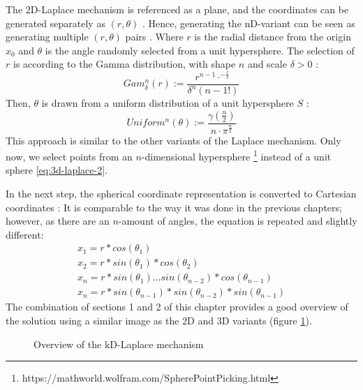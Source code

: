 The 2D-Laplace mechanism is referenced as a plane, and the coordinates can be generated separately as $(r, \theta)$ \citep{fernandes_generalised_2019,DBLP:journals/corr/abs-1212-1984}.
Hence, generating the nD-variant can be seen as generating multiple $(r, \theta)$ pairs \citep{fernandes_generalised_2019}.
Where $r$ is the radial distance from the origin $x_0$ and $\theta$ is the angle randomly selected from a unit hypersphere.
The selection of $r$ is according to the Gamma distribution, with shape $n$ and scale $\delta > 0$ \cite{fernandes_generalised_2019}:
\begin{equation}
  Gam^n_\delta(r) := \frac{r^{n-1}\cdot^{-\frac{r}{\delta}}}{\delta^n(n-1!)}
\end{equation}
Then, $\theta$ is drawn from a uniform distribution of a unit hypersphere $S$ \citep{fernandes_generalised_2019}:
\begin{equation}
  Uniform^n(\theta) := \frac{\gamma(\frac{n}{2})}{n \cdot \pi ^{\frac{n}{2}}}
\end{equation}
This approach is similar to the other variants of the Laplace mechanism.
Only now, we select points from an $n$-dimensional hypersphere  \footnote{https://mathworld.wolfram.com/SpherePointPicking.html} instead of a unit sphere \ref{eq:3d-laplace-2}. \newline

In the next step, the spherical coordinate representation is converted to Cartesian coordinates \citep{fernandes_generalised_2019}:
It is comparable to the way it was done in the previous chapters; however, as there are an $n$-amount of angles, the equation is repeated and slightly different:
\begin{align}
  x_1 = r * cos (\theta_1)                                          \\
  x_2 = r * sin (\theta_1) * cos (\theta_2)                         \\
  x_{n} = r * sin(\theta_1) … sin(\theta_{n-2}) *cos (\theta_{n-1}) \\
  x_n = r * sin(\theta_{n-1}) * sin(\theta_{n-2}) * sin(\theta_{n-1})
  \label{eq:nd-laplace-cartesian}
\end{align}
The combination of sections 1 and 2 of this chapter provides a good overview of the solution using a similar image as the 2D and 3D variants (figure \ref{fig:nd-laplace-overview}).
\begin{figure}[H]
  
  \caption{Overview of the kD-Laplace mechanism}
  \label{fig:nd-laplace-overview}
\end{figure}

